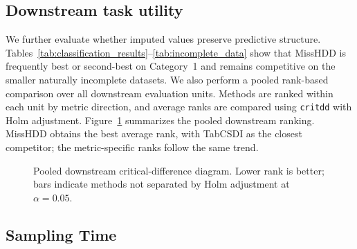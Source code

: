 \documentclass[times, review, 10pt]{elsarticle}
\begin{document}
\subsection{Downstream task utility}

We further evaluate whether imputed values preserve predictive structure.
Tables~\ref{tab:classification_results}--\ref{tab:incomplete_data} show that
MissHDD is frequently best or second-best on Category~1 and remains competitive
on the smaller naturally incomplete datasets. We also perform a pooled rank-based comparison over all downstream evaluation
units. Methods are ranked within
each unit by metric direction, and average ranks are compared using
\texttt{critdd} with Holm adjustment. Figure~\ref{fig:cd_downstream} summarizes the pooled downstream ranking.
MissHDD obtains the best average rank, with TabCSDI as the closest competitor;
the metric-specific ranks follow the same trend.

\begin{figure}[!t]
\centering
\resizebox{0.92\textwidth}{!}{}
\caption{Pooled downstream critical-difference diagram. Lower rank is better;
bars indicate methods not separated by Holm adjustment at $\alpha=0.05$.}
\label{fig:cd_downstream}
\end{figure}





\subsection{Sampling Time}
\end{document}
